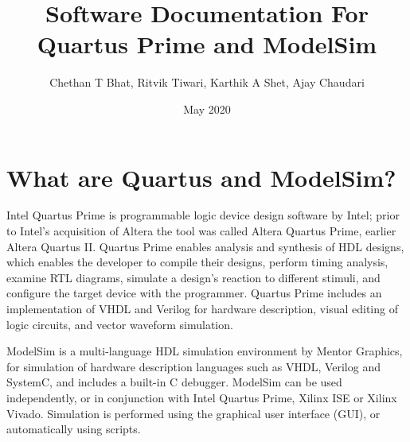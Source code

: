 \documentclass[12pt,singleside,a4paper]{article}
\title{Software Documentation For Quartus Prime and ModelSim}
\author{Chethan T Bhat, Ritvik Tiwari, Karthik A Shet, Ajay Chaudari}
\date{May 2020}
\begin{document}
\maketitle
\newpage
\tableofcontents
\newpage
{}


\begin{sloppypar}
\section{What are Quartus and ModelSim?}
\end{sloppypar}

Intel Quartus Prime is programmable logic device design software by Intel; prior to Intel's acquisition of Altera the tool was called Altera Quartus Prime, earlier Altera Quartus II. Quartus Prime enables analysis and synthesis of HDL designs, which enables the developer to compile their designs, perform timing analysis, examine RTL diagrams, simulate a design's reaction to different stimuli, and configure the target device with the programmer. Quartus Prime includes an implementation of VHDL and Verilog for hardware description, visual editing of logic circuits, and vector waveform simulation.

ModelSim is a multi-language HDL simulation environment by Mentor Graphics, for simulation of hardware description languages such as VHDL, Verilog and SystemC, and includes a built-in C debugger. ModelSim can be used independently, or in conjunction with Intel Quartus Prime, Xilinx ISE or Xilinx Vivado. Simulation is performed using the graphical user interface (GUI), or automatically using scripts.
\\


\end{document}
